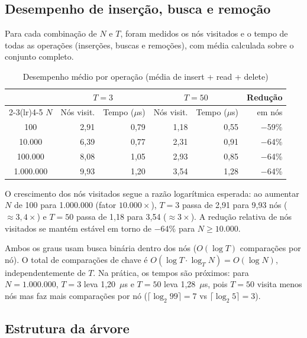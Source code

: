 \documentclass{ifpr-pinhais}
\begin{document}
\subsection{Desempenho de inserção, busca e remoção}

Para cada combinação de $N$ e $T$, foram medidos os nós visitados e o tempo de todas as operações (inserções, buscas e remoções), com média calculada sobre o conjunto completo.

\begin{table}[H]
\centering
\caption{Desempenho médio por operação (média de insert + read + delete)}
\label{tab:insert}
\begin{tabular}{c rr rr r}
\toprule
 & \multicolumn{2}{c}{$T = 3$} & \multicolumn{2}{c}{$T = 50$} & Redução \\
\cmidrule(lr){2-3}\cmidrule(lr){4-5}
$N$ & Nós visit. & Tempo ($\mu$s) & Nós visit. & Tempo ($\mu$s) & em nós \\
\midrule
100        & 2,91 & 0,79 & 1,18 & 0,55 & $-$59\% \\
10.000     & 6,39 & 0,77 & 2,31 & 0,91 & $-$64\% \\
100.000    & 8,08 & 1,05 & 2,93 & 0,85 & $-$64\% \\
1.000.000  & 9,93 & 1,20 & 3,54 & 1,28 & $-$64\% \\
\bottomrule
\end{tabular}
\end{table}

O crescimento dos nós visitados segue a razão logarítmica esperada: ao aumentar $N$ de 100 para 1.000.000 (fator $10.000\times$), $T = 3$ passa de 2,91 para 9,93 nós ($\approx 3{,}4\times$) e $T = 50$ passa de 1,18 para 3,54 ($\approx 3\times$). A redução relativa de nós visitados se mantém estável em torno de $-$64\% para $N \geq 10.000$.

Ambos os graus usam busca binária dentro dos nós ($O(\log T)$ comparações por nó). O total de comparações de chave é $O(\log T \cdot \log_T N) = O(\log N)$, independentemente de $T$. Na prática, os tempos são próximos: para $N = 1.000.000$, $T = 3$ leva 1,20~$\mu$s e $T = 50$ leva 1,28~$\mu$s, pois $T = 50$ visita menos nós mas faz mais comparações por nó ($\lceil\log_2 99\rceil = 7$ vs $\lceil\log_2 5\rceil = 3$).

\subsection{Estrutura da árvore}
\end{document}
